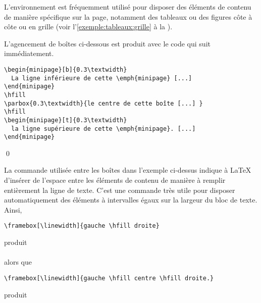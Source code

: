 L'environnement  est fréquemment utilisé pour disposer
des éléments de contenu de manière spécifique sur la page, notamment
des tableaux ou des figures côte à côte ou en grille (voir
l'\autoref{exemple:tableaux:grille} à la
).

\begin{exemple}
  L'agencement de boîtes ci-dessous est produit avec le code qui suit
  immédiatement.  \\[0.5\baselineskip]
  \begin{minipage}{\textwidth}
    \makebox[0pt][l]{\color{lightgray}\rule{\textwidth}{0.7pt}}\relax
     \hfill {}
    \hfill {}
  \end{minipage}
\begin{lstlisting}
\begin{minipage}[b]{0.3\textwidth}
  La ligne inférieure de cette \emph{minipage} [...]
\end{minipage}
\hfill
\parbox{0.3\textwidth}{le centre de cette boîte [...] }
\hfill
\begin{minipage}[t]{0.3\textwidth}
  la ligne supérieure de cette \emph{minipage}. [...]
\end{minipage}
\end{lstlisting}
  \qed
\end{exemple}

La commande \cmd{\hfill} utilisée entre les boîtes dans l'exemple
ci-dessus indique à {\LaTeX} d'insérer de l'espace entre les éléments
de contenu de manière à remplir entièrement la ligne de texte. C'est
une commande très utile pour disposer automatiquement des éléments à
intervalles égaux sur la largeur du bloc de texte. Ainsi,
\begin{lstlisting}
\framebox[\linewidth]{gauche \hfill droite}
\end{lstlisting}
produit \\[0.5\baselineskip]
 \\[0.5\baselineskip]
alors que
\begin{lstlisting}
\framebox[\linewidth]{gauche \hfill centre \hfill droite.}
\end{lstlisting}
produit \\[0.5\baselineskip]



